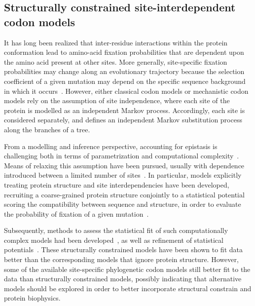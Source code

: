 \subsection{Structurally constrained site-interdependent codon models}
\label{subsec:structurally-constrained-site-interdependent-codon-models}

It has long been realized that inter-residue interactions within the protein conformation lead to amino-acid fixation probabilities that are dependent upon the amino acid present at other sites.
More generally, site-specific fixation probabilities may change along an evolutionary trajectory because the selection coefficient of a given mutation may depend on the specific sequence background in which it occurs~\citep{Goldstein2016}.
However, either classical codon models or mechanistic codon models rely on the assumption of site independence, where each site of the protein is modelled as an independent Markov process.
Accordingly, each site is considered separately, and defines an independent Markov substitution process along the branches of a tree.

From a modelling and inference perspective, accounting for epistasis is challenging both in terms of parametrization and computational complexity~\citep{Manhart2014}.
Means of relaxing this assumption have been pursued, usually with dependence introduced between a limited number of sites~\citep{Felsenstein1996}.
In particular, models explicitly treating protein structure and site interdependencies have been developed, recruiting a coarse-grained protein structure conjointly to a statistical potential scoring the compatibility between sequence and structure, in order to evaluate the probability of fixation of a given mutation~\citep{Robinson2003, Rodrigue2005}.

Subsequently, methods to assess the statistical fit of such computationally complex models had been developed~\citep{Rodrigue2009}, as well as refinement of statistical potentials~\citep{Kleinman2010}.
These structurally constrained models have been shown to fit data better than the corresponding models that ignore protein structure.
However, some of the available site-specific phylogenetic codon models still better fit to the data than structurally constrained models, possibly indicating that alternative models should be explored in order to better incorporate structural constrain and protein biophysics.

